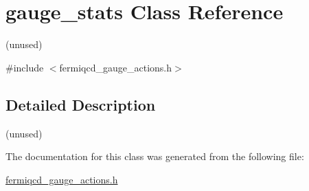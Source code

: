 \hypertarget{classgauge__stats}{}\section{gauge\+\_\+stats Class Reference}
\label{classgauge__stats}


(unused)  




{\ttfamily \#include $<$fermiqcd\+\_\+gauge\+\_\+actions.\+h$>$}



\subsection{Detailed Description}
(unused) 

The documentation for this class was generated from the following file\+:\begin{DoxyCompactItemize}
\item 
\hyperlink{fermiqcd__gauge__actions_8h}{fermiqcd\+\_\+gauge\+\_\+actions.\+h}\end{DoxyCompactItemize}
